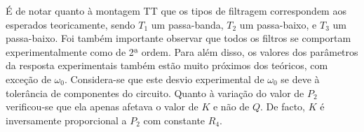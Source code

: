 É de notar quanto à montagem TT que os tipos de filtragem correspondem aos esperados teoricamente, sendo $T_1$ um passa-banda, $T_2$ um passa-baixo, e $T_3$ um passa-baixo. Foi também importante observar que todos os filtros se comportam experimentalmente como de 2ª ordem. Para além disso, os valores dos parâmetros da resposta experimentais também estão muito próximos dos teóricos, com exceção de $\omega_0$. Considera-se que este desvio experimental de $\omega_0$ se deve à tolerância de componentes do circuito. Quanto à variação do valor de $P_2$ verificou-se que ela apenas afetava o valor de $K$ e não de $Q$. De  facto, $K$ é inversamente proporcional a $P_2$ com constante $R_4$.

\clearpage